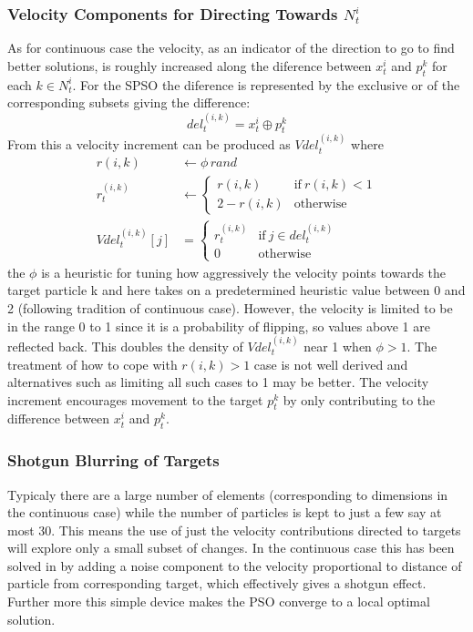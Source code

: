 \documentclass[a4paper,oneside,english]{article}
\numberwithin{equation}{section}
\numberwithin{figure}{section}
\begin{document}
\subsubsection{Velocity Components for Directing Towards $N_t^i$}
As for continuous case the velocity, as an indicator of the direction to go to find better solutions, is roughly increased along the diference between $x_t^i$ and $p_t^k$ for each $k \in  N_t^i$. For the SPSO the diference is represented by the exclusive or of the corresponding subsets giving the difference:
$$del_t^{(i,k)}= x_t^i\oplus p_t^k$$ 
From this a velocity increment can be produced  as $Vdel_t^{(i,k)}$ where  
\begin{align}
\label{randPhi} r(i,k)&\leftarrow\phi\, rand\\
\label{limitPhi}r_t^{(i,k)}&\leftarrow\begin{cases}
r(i,k)& \mathrm{if}\:r(i,k)<1\\
2-r(i,k)& \mathrm{otherwise}
\end{cases}\\
\label{targVel}Vdel_t^{(i,k)}[j]&=\begin{cases}
r_t^{(i,k)}& \mathrm{if}\: j \in del_t^{(i,k)}\\
0 &\mathrm{otherwise}
\end{cases}
\end{align}
the $\phi$ is a heuristic for tuning how aggressively the velocity points towards the  target particle k and here takes on a predetermined heuristic value between 0 and 2 (following tradition of continuous case). However, the velocity is limited to be in the range 0 to 1 since it is a probability of flipping, so values above 1 are reflected back. This doubles the density of $Vdel_t^{(i,k)}$ near 1 when  $\phi > 1$. The treatment of how to cope with $r(i,k) >1$ case is not well derived and  alternatives such as limiting all such cases to 1 may be better. The velocity increment encourages movement to the target $p_t^k$ by only contributing to the difference between $x_t^i$ and  $p_t^k$.
\subsubsection{Shotgun Blurring of Targets }
Typicaly there are a large number of elements (corresponding to dimensions in the continuous case) while the number of particles  is kept to just a few say at most 30. This means the use of just the velocity contributions directed to targets will explore only a small subset of changes. In the continuous case this has been solved in \cite{LcRiPSO} by adding a noise component to the velocity proportional to distance of particle from corresponding target, which effectively gives a shotgun effect. Further more this simple device makes the PSO converge to a local optimal solution.
\end{document}
